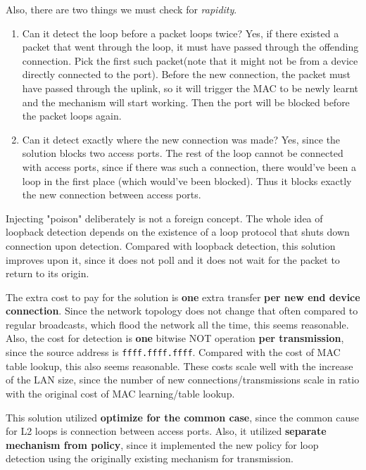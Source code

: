 \documentclass{article}
\begin{document}
Also, there are two things we must check for \textit{rapidity}.

\begin{enumerate}
    \item Can it detect the loop before a packet loops twice? Yes, if there existed a packet that went through the loop, it must have passed through the offending connection. Pick the first such packet(note that it might not be from a device directly connected to the port). Before the new connection, the packet must have passed through the uplink, so it will trigger the MAC to be newly learnt and the mechanism will start working. Then the port will be blocked before the packet loops again.
    \item Can it detect exactly where the new connection was made? Yes, since the solution blocks two access ports. The rest of the loop cannot be connected with access ports, since if there was such a connection, there would've been a loop in the first place (which would've been blocked). Thus it blocks exactly the new connection between access ports.
\end{enumerate}

Injecting "poison" deliberately is not a foreign concept. The whole idea of loopback detection depends on the existence of a loop protocol that shuts down connection upon detection\cite{lbd-cisco}. Compared with loopback detection, this solution improves upon it, since it does not poll and it does not wait for the packet to return to its origin.

The extra cost to pay for the solution is \textbf{one} extra transfer \textbf{per new end device connection}. Since the network topology does not change that often compared to regular broadcasts, which flood the network all the time, this seems reasonable. Also, the cost for detection is \textbf{one} bitwise NOT operation \textbf{per transmission}, since the source address is \texttt{ffff.ffff.ffff}. Compared with the cost of MAC table lookup, this also seems reasonable. These costs scale well with the increase of the LAN size, since the number of new connections/transmissions scale in ratio with the original cost of MAC learning/table lookup.

This solution utilized \textbf{optimize for the common case}, since the common cause for L2 loops is connection between access ports. Also, it utilized \textbf{separate mechanism from policy}, since it implemented the new policy for loop detection using the originally existing mechanism for transmission.

\printbibliography
\end{document}
